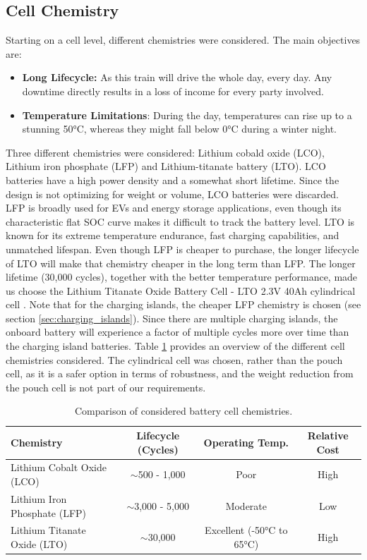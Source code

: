 \subsection{Cell Chemistry}
Starting on a cell level, different chemistries were considered. The main objectives are:
\begin{itemize}
    \item \textbf{Long Lifecycle:} As this train will drive the whole day, every day. Any downtime directly results in a loss of income for every party involved.
    \item \textbf{Temperature Limitations}: During the day, temperatures can rise up to a stunning 50°C, whereas they might fall below 0°C during a winter night.
\end{itemize}
Three different chemistries were considered: Lithium cobald oxide (LCO), Lithium iron phosphate (LFP) and Lithium-titanate battery (LTO). LCO batteries have a high power density and a somewhat short lifetime. Since the design is not optimizing for weight or volume, LCO batteries were discarded. LFP is broadly used for EVs and energy storage applications, even though its characteristic flat SOC curve makes it difficult to track the battery level. LTO is known for its extreme temperature endurance, fast charging capabilities, and unmatched lifespan. Even though LFP is cheaper to purchase, the longer lifecycle of LTO will make that chemistry cheaper in the long term than LFP. The longer lifetime (30,000 cycles), together with the better temperature performance, made us choose the Lithium Titanate Oxide Battery Cell - LTO 2.3V 40Ah cylindrical cell \cite{LTO}. Note that for the charging islands, the cheaper LFP chemistry is chosen (see section \ref{sec:charging_islands}). Since there are multiple charging islands, the onboard battery will experience a factor of multiple cycles more over time than the charging island batteries. Table \ref{tab:cell_chemistry} provides an overview of the different cell chemistries considered.
\newline The cylindrical cell was chosen, rather than the pouch cell, as it is a safer option in terms of robustness, and the weight reduction from the pouch cell is not part of our requirements. 

\begin{table}[htbp]
    \centering
        \caption{Comparison of considered battery cell chemistries.}
    \begin{tabular}{|l|c|c|c|}
        \hline
        \textbf{Chemistry} & \textbf{Lifecycle (Cycles)} & \textbf{Operating Temp.} & \textbf{Relative Cost} \\
        \hline
        Lithium Cobalt Oxide (LCO) & $\sim$500 - 1,000 & Poor & High \\
        Lithium Iron Phosphate (LFP)& $\sim$3,000 - 5,000 & Moderate & Low \\
        Lithium Titanate Oxide (LTO) & $\sim$30,000 & Excellent (-50°C to 65°C) & High \\
        \hline
    \end{tabular}
    \label{tab:cell_chemistry}
\end{table}

